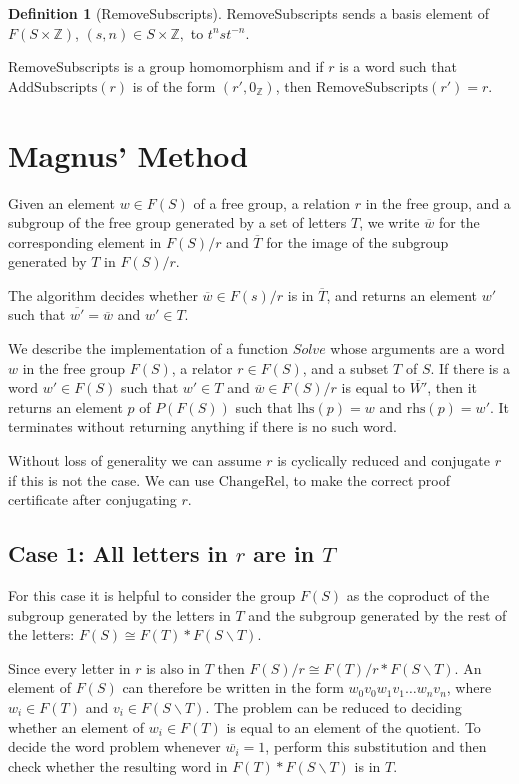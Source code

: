 \documentclass[11pt]{article} %
\theoremstyle{definition}
\theoremstyle{definition}
\theoremstyle{definition}
\theoremstyle{definition}
\theoremstyle{definition}
\newtheorem{defn}[theorem]{Definition}
\theoremstyle{definition}
\begin{document}
\begin{defn}[RemoveSubscripts]
  RemoveSubscripts sends a basis element of $F(S\times \mathbb{Z})$,  $(s, n) \in S\times \mathbb{Z},$
  to $t^n s t^{-n}$.
\end{defn}
RemoveSubscripts is a group homomorphism and if $r$ is a word such that $\text{AddSubscripts}(r)$ is of the form $(r', 0_\mathbb{Z})$,
then $\text{RemoveSubscripts}(r')=r$.

\section{Magnus' Method}

Given an element $w \in F(S)$ of a free group, a relation $r$ in the free group, and a subgroup of the free group
generated by a set of letters $T$,
we write $\overline {w}$ for the corresponding element in $F(S) / r$
and $\overline{T}$ for the image of the subgroup generated by $T$ in $F(S)/r$.

The algorithm decides whether $\overline{w} \in F(s) / r$ is in $\overline{T}$,
and returns an element $w'$ such that $\overline{w'} = \overline{w}$ and $w' \in T$.

We describe the implementation of a function $\textit{Solve}$ whose arguments are a word $w$
in the free group $F(S)$, a relator $r \in F(S)$,
and a subset $T$ of $S$. If there is a word $w' \in F(S)$
such that $w' \in T$ and $\overline{w} \in F(S) / r$ is
equal to $\overline{W'}$, then it returns an element $p$ of $P(F(S))$
such that $\text{lhs}(p) = w$ and $\text{rhs}(p) = w'$. It terminates
without returning anything if there is no such word.

Without loss of generality we can assume $r$ is cyclically reduced and
conjugate $r$ if this is not the case. We can use $\text{ChangeRel}$,
to make the correct proof certificate after conjugating $r$.



\subsection{Case 1: All letters in $r$ are in $T$}\label{allinT}
For this case it is helpful to consider the group $F(S)$ as the
coproduct of the subgroup generated by the letters in $T$ and
the subgroup generated by the rest of the letters:
$F(S) \cong F(T) \ast F(S \backslash T)$.

Since every letter in $r$ is also in $T$ then $F(S) / r \cong F(T) / r \ast F(S \backslash T)$.
An element of $F(S)$ can therefore be written in the form
$w_0v_0w_1v_1 \dots w_nv_n$, where $w_i \in F(T)$ and $v_i \in F(S \backslash T)$.
The problem can be reduced to deciding whether an element of $w_i \in F(T)$ is equal to an element of the quotient.
To decide the word problem whenever $\overline{w_i} = 1$, perform this substitution and
then check whether the resulting word in $F(T) \ast F(S \backslash T)$ is in $T$.
\end{document}
